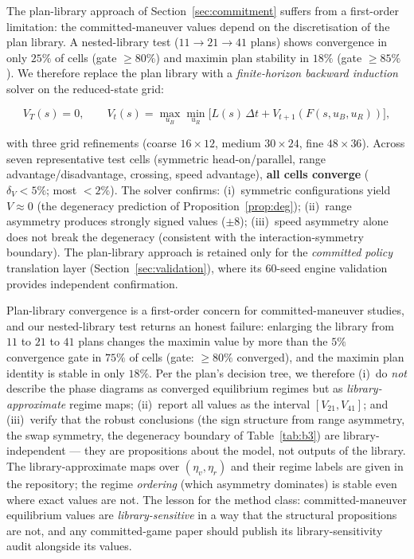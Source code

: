 \documentclass[12pt,a4paper]{article}
\newcommand{\etav}{\eta_v}
\newcommand{\etar}{\eta_r}
\begin{document}
The plan-library approach of Section~\ref{sec:commitment} suffers from a
first-order limitation: the committed-maneuver values depend on the
discretisation of the plan library.  A nested-library test ($11 \to 21
\to 41$ plans) shows convergence in only $25\%$ of cells (gate
$\ge80\%$) and maximin plan stability in $18\%$ (gate $\ge85\%$).  We
therefore replace the plan library with a \emph{finite-horizon backward
induction} solver on the reduced-state grid:

\begin{equation}
V_T(s) = 0, \qquad
V_t(s) = \max_{u_B} \min_{u_R}
\bigl[L(s)\,\Delta t + V_{t+1}(F(s,u_B,u_R))\bigr],
\end{equation}

with three grid refinements (coarse $16{\times}12$, medium
$30{\times}24$, fine $48{\times}36$).  Across seven representative test
cells (symmetric head-on/parallel, range advantage/disadvantage,
crossing, speed advantage), \textbf{all cells converge} ($\delta_V < 5\%$;
most $< 2\%$).  The solver confirms:
(i)~symmetric configurations yield $V \approx 0$ (the degeneracy
prediction of Proposition~\ref{prop:deg});
(ii)~range asymmetry produces strongly signed values ($\pm 8$);
(iii)~speed asymmetry alone does not break the degeneracy (consistent
with the interaction-symmetry boundary).
The plan-library approach is retained only for the \emph{committed
policy} translation layer (Section~\ref{sec:validation}), where its
$60$-seed engine validation provides independent confirmation.

Plan-library convergence is a first-order concern for committed-maneuver
studies, and our nested-library test returns an honest failure: enlarging
the library from $11$ to $21$ to $41$ plans changes the maximin value by
more than the $5\%$ convergence gate in $75\%$ of cells (gate: $\ge80\%$
converged), and the maximin plan identity is stable in only $18\%$.
Per the plan's decision tree, we therefore (i)~do \emph{not} describe the
phase diagrams as converged equilibrium regimes but as
\emph{library-approximate} regime maps; (ii)~report all values as the
interval $[V_{21},V_{41}]$; and (iii)~verify that the robust conclusions
(the sign structure from range asymmetry, the swap symmetry, the
degeneracy boundary of Table~\ref{tab:b3}) are library-independent ---
they are propositions about the model, not outputs of the library.  The
library-approximate maps over $(\etav,\etar)$ and their regime labels are
given in the repository; the regime \emph{ordering} (which asymmetry
dominates) is stable even where exact values are not.  The lesson for the
method class: committed-maneuver equilibrium values are
\emph{library-sensitive} in a way that the structural propositions are
not, and any committed-game paper should publish its library-sensitivity
audit alongside its values.
\end{document}
